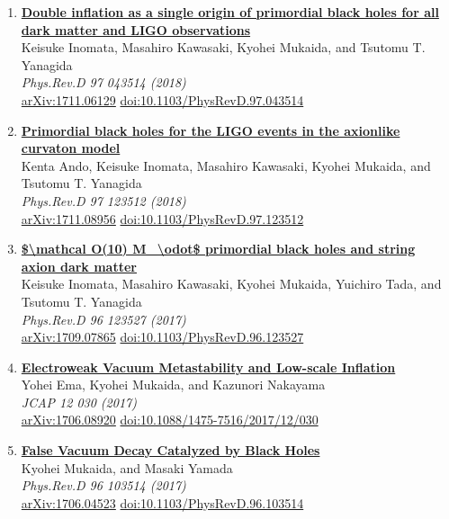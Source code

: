 \begin{enumerate}
\item \textbf{\href{https://arxiv.org/abs/1711.06129}{Double inflation as a single origin of primordial black holes for all dark matter and LIGO observations}}\\
Keisuke Inomata, Masahiro Kawasaki, Kyohei Mukaida, and Tsutomu T. Yanagida\\
\emph{Phys.Rev.D 97 043514 (2018)}
\\ \href{https://arxiv.org/abs/1711.06129}{arXiv:1711.06129} \href{https://doi.org/10.1103/PhysRevD.97.043514}{doi:10.1103/PhysRevD.97.043514}

\item \textbf{\href{https://arxiv.org/abs/1711.08956}{Primordial black holes for the LIGO events in the axionlike curvaton model}}\\
Kenta Ando, Keisuke Inomata, Masahiro Kawasaki, Kyohei Mukaida, and Tsutomu T. Yanagida\\
\emph{Phys.Rev.D 97 123512 (2018)}
\\ \href{https://arxiv.org/abs/1711.08956}{arXiv:1711.08956} \href{https://doi.org/10.1103/PhysRevD.97.123512}{doi:10.1103/PhysRevD.97.123512}

\item \textbf{\href{https://arxiv.org/abs/1709.07865}{\$\textbackslash{}mathcal O(10) M\_\textbackslash{}odot\$ primordial black holes and string axion dark matter}}\\
Keisuke Inomata, Masahiro Kawasaki, Kyohei Mukaida, Yuichiro Tada, and Tsutomu T. Yanagida\\
\emph{Phys.Rev.D 96 123527 (2017)}
\\ \href{https://arxiv.org/abs/1709.07865}{arXiv:1709.07865} \href{https://doi.org/10.1103/PhysRevD.96.123527}{doi:10.1103/PhysRevD.96.123527}

\item \textbf{\href{https://arxiv.org/abs/1706.08920}{Electroweak Vacuum Metastability and Low-scale Inflation}}\\
Yohei Ema, Kyohei Mukaida, and Kazunori Nakayama\\
\emph{JCAP 12 030 (2017)}
\\ \href{https://arxiv.org/abs/1706.08920}{arXiv:1706.08920} \href{https://doi.org/10.1088/1475-7516/2017/12/030}{doi:10.1088/1475-7516/2017/12/030}

\item \textbf{\href{https://arxiv.org/abs/1706.04523}{False Vacuum Decay Catalyzed by Black Holes}}\\
Kyohei Mukaida, and Masaki Yamada\\
\emph{Phys.Rev.D 96 103514 (2017)}
\\ \href{https://arxiv.org/abs/1706.04523}{arXiv:1706.04523} \href{https://doi.org/10.1103/PhysRevD.96.103514}{doi:10.1103/PhysRevD.96.103514}


\end{enumerate}
